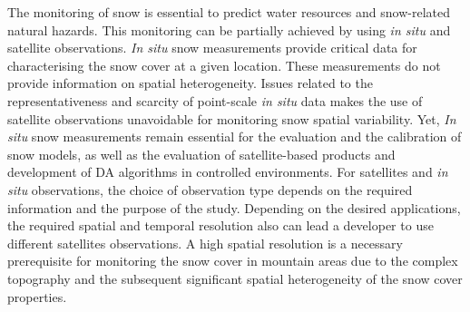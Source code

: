 \documentclass[utf8]{frontiersSCNS} %
\begin{document}
The monitoring of snow is essential to predict water resources and snow-related natural hazards. This monitoring can be partially achieved by using \textit{in situ} and satellite observations. \textit{In situ} snow measurements provide critical data for characterising the snow cover at a given location. These measurements do not provide information on spatial heterogeneity. Issues related to the representativeness and scarcity of point-scale \textit{in situ} data makes the use of satellite observations unavoidable for monitoring snow spatial variability. Yet, \textit{In situ} snow measurements remain essential for the evaluation and the calibration of snow models, as well as the evaluation of satellite-based products and development of DA algorithms in controlled environments. For satellites and \textit{in situ} observations, the choice of observation type depends on the required information and the purpose of the study. Depending on the desired applications, the required spatial and temporal resolution also can lead a developer to use different satellites observations. A high spatial resolution is a necessary prerequisite for monitoring the snow cover in mountain areas due to the complex topography and the subsequent significant spatial heterogeneity of the snow cover properties. 
\end{document}
